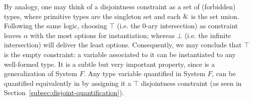 By analogy, one may think of a disjointness constraint as a set of (forbidden) types, where 
primitive types are the singleton set and each $\&$ is the set union.
Following the same logic, choosing $\top$ (i.e. the 0-ary intersection)
as constraint leaves $\alpha$ with the most options for instantiation; 
whereas $\bot$ (i.e. the infinite intersection) will deliver the least options.
Consequently, we may conclude that $\top$ is the empty constraint: 
a variable associated to it can be instantiated to any well-formed type.
It is a subtle but very important property, since \name is a generalization of System $F$. 
Any type variable quantified in System $F$, can be quantified equivalently in \name
by assigning it a $\top$ disjointness constraint
(as seen in Section~\ref{subsec:disjoint-quantification}).
